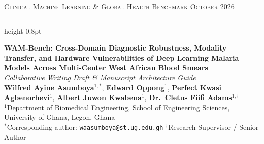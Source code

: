 \documentclass[a4paper,11pt]{article}
\begin{document}
\noindent
{\footnotesize\scshape Clinical Machine Learning \& Global Health Benchmark \hfill October 2026}
\vspace{3pt}
\hrule height 0.8pt
\vspace{1.5em}

\begin{center}
{\LARGE\bfseries WAM-Bench: Cross-Domain Diagnostic Robustness, Modality Transfer, and Hardware Vulnerabilities of Deep Learning Malaria Models Across Multi-Center West African Blood Smears}\\[0.6em]
{\large\itshape Collaborative Writing Draft \& Manuscript Architecture Guide}\\[1.3em]

{\large \textbf{Wilfred Ayine Asumboya}$^{1,*}$, \textbf{Edward Oppong}$^{1}$, \textbf{Perfect Kwasi Agbenorhevi}$^{1}$, \textbf{Albert Juwon Kwabena}$^{1}$, \textbf{Dr.~Cletus Fiifi Adams}$^{1,\dagger}$}\\[0.45em]
{\small $^{1}$Department of Biomedical Engineering, School of Engineering Sciences, University of Ghana, Legon, Ghana}\\[0.2em]
{\footnotesize $^*$Corresponding author: \texttt{waasumboya@st.ug.edu.gh} \quad $^\dagger$Research Supervisor / Senior Author}\\[1.2em]
\end{center}
\end{document}
